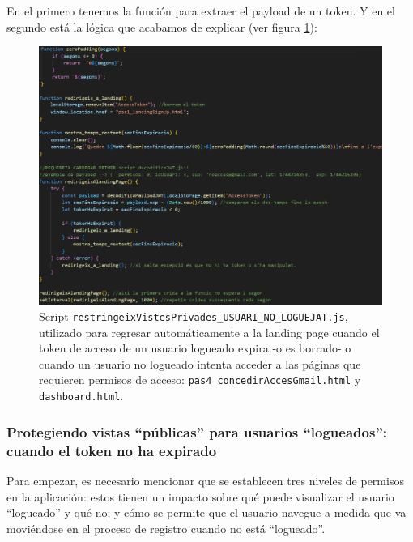 \documentclass[a4paper,12pt]{report}
\begin{document}
	
	En el primero tenemos la función para extraer el payload de un token. Y en el segundo está la lógica que acabamos de explicar (ver figura \ref{fig:restringeixVistesPrivades_USUARI_NO_LOGUEJAT}):
	
	
	\setlength{\belowcaptionskip}{3pt}
	\FloatBarrier
	\begin{figure}[H]
		\centering
		\caption{Script \texttt{restringeixVistesPrivades\_USUARI\_NO\_LOGUEJAT.js}, utilizado para regresar automáticamente a la landing page cuando el token de acceso de un usuario logueado expira -o es borrado- o cuando un usuario no logueado intenta acceder a las páginas que requieren permisos de acceso: \texttt{pas4\_concedirAccesGmail.html} y \texttt{dashboard.html}.}
		\includegraphics[width=1\linewidth]{img/restringeixVistesPrivades_USUARI_NO_LOGUEJAT.png}

		\label{fig:restringeixVistesPrivades_USUARI_NO_LOGUEJAT}
	\end{figure}
	\FloatBarrier
	
	\subsubsection{Protegiendo vistas ``públicas'' para usuarios ``logueados'': cuando el token no ha expirado}
	\label{sec:vistasPermisosPublic}
	

	
	Para empezar, es necesario mencionar que se establecen tres niveles de permisos en la aplicación: estos  tienen un impacto sobre qué puede visualizar el usuario ``logueado'' y qué no; y cómo se permite que el usuario navegue a medida que va moviéndose en el proceso de registro cuando no está ``logueado''.
	
\end{document}
